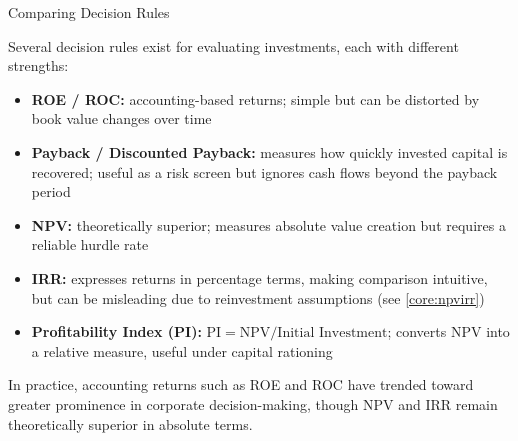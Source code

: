 \documentclass[10pt]{article}
\begin{document}
    \begin{core}{Comparing Decision Rules}

      Several decision rules exist for evaluating investments, each with different strengths:

      \begin{itemize}

        \item \textbf{ROE / ROC:} accounting-based returns; simple but can be distorted by book value changes over time

        \item \textbf{Payback / Discounted Payback:} measures how quickly invested capital is recovered; useful as a risk screen but ignores cash flows beyond the payback period

        \item \textbf{NPV:} theoretically superior; measures absolute value creation but requires a reliable hurdle rate

        \item \textbf{IRR:} expresses returns in percentage terms, making comparison intuitive, but can be misleading due to reinvestment assumptions (see \autoref{core:npvirr})

        \item \textbf{Profitability Index (PI):} $\text{PI} = \text{NPV} / \text{Initial Investment}$; converts NPV into a relative measure, useful under capital rationing

      \end{itemize}

      In practice, accounting returns such as ROE and ROC have trended toward greater prominence in corporate decision-making, though NPV and IRR remain theoretically superior in absolute terms.


    \end{core}
\end{document}
